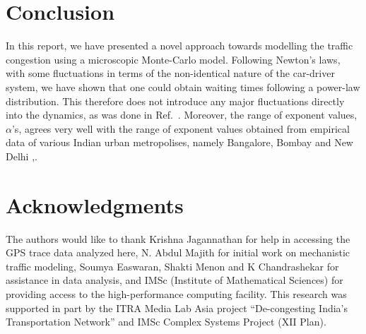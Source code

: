 \documentclass[conference]{IEEEtran}
\begin{document}
\section{Conclusion}
In this report, we have presented a novel approach towards modelling the traffic congestion using a microscopic Monte-Carlo model. Following Newton's laws, with some fluctuations in terms of the non-identical nature of the car-driver system, we have shown that one could obtain waiting times following a power-law distribution. This therefore does not introduce any major fluctuations directly into the dynamics, as was done in Ref.~\cite{Majith2016}. Moreover, the range of exponent values, $\alpha$'s, agrees very well with the range of exponent values obtained from empirical data of various Indian urban metropolises, namely Bangalore, Bombay and New Delhi \cite{Majith2016},\cite{Majith2015}.


\section*{Acknowledgments}

The authors would like to thank Krishna Jagannathan for help in
accessing the GPS trace data analyzed here, N. Abdul Majith for
initial work on mechanistic traffic modeling, Soumya Easwaran, Shakti
Menon and K Chandrashekar for assistance in data analysis, and IMSc (Institute of Mathematical Sciences)
for providing access to the high-performance computing facility.
This research was supported in part by the ITRA Media Lab Asia 
project ``De-congesting India's Transportation Network'' and IMSc
Complex Systems Project (XII Plan).

\end{document}
